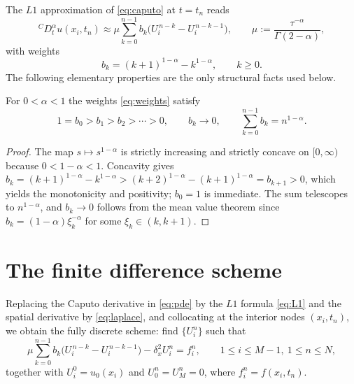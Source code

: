 \documentclass[11pt]{ajam}
\newcommand{\dtt}{{}^{C}\!D_t^{\alpha}}
\newcommand{\Gam}{\Gamma}
\begin{document}
The $L1$ approximation of \eqref{eq:caputo} at $t=t_n$ reads
\begin{equation}\label{eq:L1}
  \dtt u(x_i,t_n) \approx \mu \sum_{k=0}^{n-1} b_k
  \bigl(U_i^{\,n-k} - U_i^{\,n-k-1}\bigr),
  \qquad
  \mu := \frac{\tau^{-\alpha}}{\Gam(2-\alpha)},
\end{equation}
with weights
\begin{equation}\label{eq:weights}
  b_k = (k+1)^{1-\alpha} - k^{1-\alpha}, \qquad k\ge 0 .
\end{equation}
The following elementary properties are the only structural facts used
below.

\begin{lemma}\label{lem:weights}
For $0<\alpha<1$ the weights \eqref{eq:weights} satisfy
\begin{equation}
  1 = b_0 > b_1 > b_2 > \cdots > 0,
  \qquad b_k \to 0,
  \qquad \sum_{k=0}^{n-1} b_k = n^{1-\alpha}.
\end{equation}
\end{lemma}

\begin{proof}
The map $s\mapsto s^{1-\alpha}$ is strictly increasing and strictly concave
on $[0,\infty)$ because $0<1-\alpha<1$. Concavity gives
$b_{k}=(k+1)^{1-\alpha}-k^{1-\alpha} > (k+2)^{1-\alpha}-(k+1)^{1-\alpha}=b_{k+1}>0$,
which yields the monotonicity and positivity; $b_0=1$ is immediate. The sum
telescopes to $n^{1-\alpha}$, and $b_k\to0$ follows from the mean value
theorem since $b_k=(1-\alpha)\xi_k^{-\alpha}$ for some $\xi_k\in(k,k+1)$.
\end{proof}

\section{The finite difference scheme}\label{sec:scheme}
Replacing the Caputo derivative in \eqref{eq:pde} by the $L1$ formula
\eqref{eq:L1} and the spatial derivative by \eqref{eq:laplace}, and
collocating at the interior nodes $(x_i,t_n)$, we obtain the fully discrete
scheme: find $\{U_i^n\}$ such that
\begin{equation}\label{eq:scheme}
  \mu\sum_{k=0}^{n-1} b_k\bigl(U_i^{\,n-k}-U_i^{\,n-k-1}\bigr)
  - \delta_x^2 U_i^n = f_i^n,
  \qquad 1\le i\le M-1,\ 1\le n\le N,
\end{equation}
together with $U_i^0=u_0(x_i)$ and $U_0^n=U_M^n=0$, where
$f_i^n=f(x_i,t_n)$.
\end{document}
